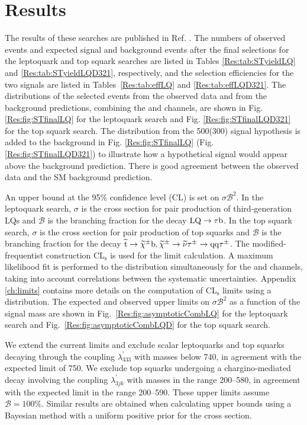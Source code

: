 \section{Results
\label{sec:results}}

The results of these searches are published in Ref. \cite{CMS-EXO-12-032-PLB}. The numbers of observed events and expected signal and background events after the final selections for the leptoquark and top squark searches are listed in Tables \ref{Res:tab:STyieldLQ} and \ref{Res:tab:STyieldLQD321}, respectively, and the selection efficiencies for the two signals are listed in Tables~\ref{Res:tab:effLQ} and \ref{Res:tab:effLQD321}. The \ST distributions of the selected events from the observed data and from the background predictions, combining the \etau and \mutau channels, are shown in Fig. \ref{Res:fig:STfinalLQ} for the leptoquark search and Fig. \ref{Res:fig:STfinalLQD321} for the top squark search. The distribution from the 500\GeV (300\GeV) signal hypothesis is added to the background in Fig. \ref{Res:fig:STfinalLQ} (Fig. \ref{Res:fig:STfinalLQD321}) to illustrate how a hypothetical signal would appear above the background prediction. There is good agreement between the observed data and the SM background prediction.

An upper bound at the 95\% confidence level (CL) is set on $\sigma \mathcal{B}^2$. In the leptoquark search, $\sigma$ is the cross section for pair production of third-generation LQs and $\mathcal{B}$ is the branching fraction for the decay $\text{LQ} \rightarrow \tau \mathrm{b}$. In the top squark search, $\sigma$ is the cross section for pair production of top squarks and $\mathcal{B}$ is the branching fraction for the decay $\widetilde{\mathrm{t}} \rightarrow \widetilde{\chi}^{\pm}\mathrm{b}, \widetilde{\chi}^{\pm} \rightarrow \widetilde{\nu}\tau^{\pm} \rightarrow \mathrm{q}\mathrm{q}\tau^{\pm}$. The modified-frequentist construction CL$_\mathrm{s}$ \cite{Read:presentation,Junk,LHC-HCG} is used for the limit calculation. A maximum likelihood fit is performed to the \ST distribution simultaneously for the \etau and \mutau channels, taking into account correlations between the systematic uncertainties. Appendix \ref{ch:limits} contains more details on the computation of CL$_\mathrm{s}$ limits using a distribution. The expected and observed upper limits on $\sigma \mathcal{B}^2$ as a function of the signal mass are shown in Fig.~\ref{Res:fig:asymptoticCombLQ} for the leptoquark search and Fig.~\ref{Res:fig:asymptoticCombLQD} for the top squark search.

We extend the current limits and exclude scalar leptoquarks and top squarks decaying through the coupling $\lambda^{\prime}_{333}$ with masses below 740\GeV, in agreement with the expected limit of 750\GeV. We exclude top squarks undergoing a chargino-mediated decay involving the coupling $\lambda^{\prime}_{3jk}$ with masses in the range 200--580\GeV, in agreement with the expected limit in the range 200--590\GeV. These upper limits assume $\mathcal{B}=100\%$. Similar results are obtained when calculating upper bounds using a
Bayesian method with a uniform positive prior for the cross section.

